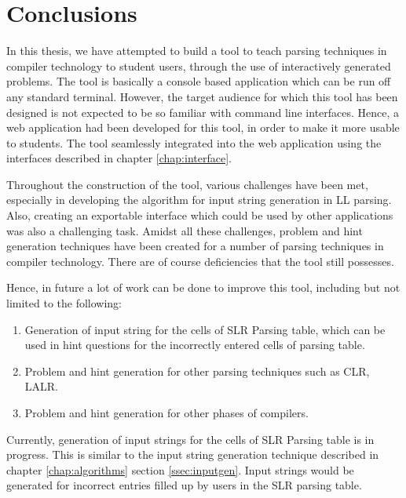 \chapter{Conclusions}
\label{chap:conclusion}
In this thesis, we have attempted to build a tool to teach parsing techniques in compiler technology to student users, through the use of interactively generated problems. The tool is basically a console based application which can be run off any standard terminal. However, the target audience for which this tool has been designed is not expected to be so familiar with command line interfaces. Hence, a web application had been developed for this tool, in order to make it more usable to students. The tool seamlessly integrated into the web application using the interfaces described in chapter \ref{chap:interface}.

Throughout the construction of the tool, various challenges have been met, especially in developing the algorithm for input string generation in LL parsing. Also, creating an exportable interface which could be used by other applications was also a challenging task. Amidst all these challenges, problem and hint generation techniques have been created for a number of parsing techniques in compiler technology. There are of course deficiencies that the tool still possesses. 

Hence, in future a lot of work can be done to improve this tool, including but not limited to the following:
\begin{enumerate}
\item Generation of input string for the cells of SLR Parsing table, which can be used in hint questions for the incorrectly entered cells of parsing table. 
\item Problem and hint generation for other parsing techniques such as CLR, LALR.
\item Problem and hint generation for other phases of compilers.
\end{enumerate}

Currently, generation of input strings for the cells of SLR Parsing table is in progress. This is similar to the input string generation technique described in chapter \ref{chap:algorithms} section \ref{ssec:inputgen}. Input strings would be generated for incorrect entries filled up by users in the SLR parsing table.